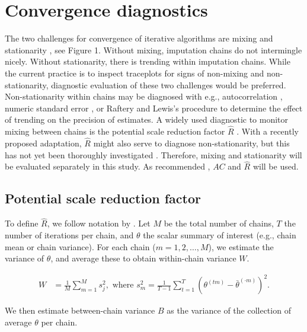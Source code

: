 \documentclass[Royal,times,sageh]{sagej}
\begin{document}
\hypertarget{convergence-diagnostics}{%
\section{Convergence diagnostics}\label{convergence-diagnostics}}

The two challenges for convergence of iterative algorithms are mixing
and stationarity \citep{gelm13}, see Figure 1. Without mixing,
imputation chains do not intermingle nicely. Without stationarity, there
is trending within imputation chains. While the current practice is to
inspect traceplots for signs of non-mixing and non-stationarity,
diagnostic evaluation of these two challenges would be preferred.
Non-stationarity within chains may be diagnosed with e.g.,
autocorrelation \citep[\(AC\);][]{scha97, gelm13}, numeric standard
error \citep[`MC error';][]{gewe92}, or Raftery and Lewis's
\citeyearpar{raft91} procedure to determine the effect of trending on
the precision of estimates. A widely used diagnostic to monitor mixing
between chains is the potential scale reduction factor \(\widehat{R}\)
\citep[`Gelman-Rubin statistic';][]{gelm92}. With a recently proposed
adaptation, \(\widehat{R}\) might also serve to diagnose
non-stationarity, but this has not yet been thoroughly investigated
\citep{veht19}. Therefore, mixing and stationarity will be evaluated
separately in this study. As recommended \citep[e.g.,][p.~898]{cowl96},
\(AC\) and \(\widehat{R}\) will be used.

\hypertarget{potential-scale-reduction-factor}{%
\subsection{Potential scale reduction
factor}\label{potential-scale-reduction-factor}}

To define \(\widehat{R}\), we follow notation by \citep[p.~5]{veht19}.
Let \(M\) be the total number of chains, \(T\) the number of iterations
per chain, and \(\theta\) the scalar summary of interest (e.g., chain
mean or chain variance). For each chain (\(m = 1, 2, \dots, M\)), we
estimate the variance of \(\theta\), and average these to obtain
within-chain variance \(W\).

\begin{align*}
W&=\frac{1}{M} \sum_{m=1}^{M} s_{j}^{2},  \text { where } s_{m}^{2}=\frac{1}{T-1} \sum_{t=1}^{T}\left(\theta^{(t m)}-\bar{\theta}^{(\cdot m)}\right)^{2}. 
\end{align*}

We then estimate between-chain variance \(B\) as the variance of the
collection of average \(\theta\) per chain.
\end{document}

